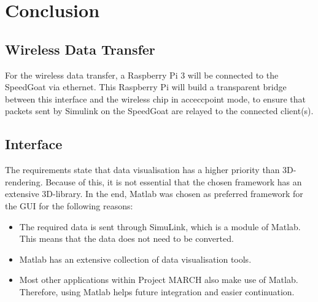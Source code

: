 \section{Conclusion}
\subsection{Wireless Data Transfer}
For the wireless data transfer, a Raspberry Pi 3 will be connected to the SpeedGoat via ethernet. This Raspberry Pi will build a transparent bridge between this interface and the wireless chip in acceccpoint mode, to ensure that packets sent by Simulink on the SpeedGoat are relayed to the connected client(s).
\subsection{Interface}
The requirements state that data visualisation has a higher priority than 3D-rendering. Because of this, it is not essential that the chosen framework has an extensive 3D-library. In the end, Matlab was chosen as preferred framework for the GUI for the following reasons:
\begin{itemize}
	\item The required data is sent through SimuLink, which is a module of Matlab. This means that the data does not need to be converted.
	\item Matlab has an extensive collection of data visualisation tools.
	\item Most other applications within Project MARCH also make use of Matlab. Therefore, using Matlab helps future integration and easier continuation.
\end{itemize}